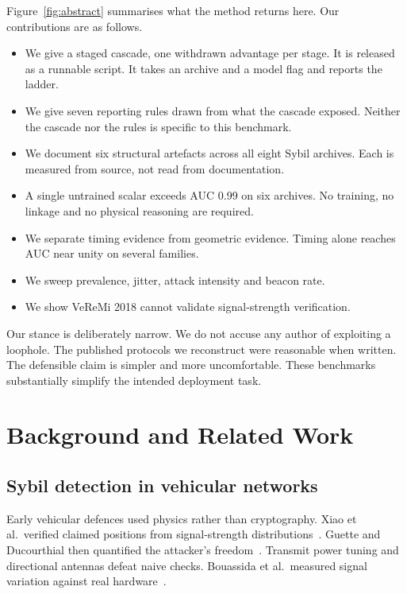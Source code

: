 \documentclass[conference]{IEEEtran}
\begin{document}
Figure~\ref{fig:abstract} summarises what the method returns here.
Our contributions are as follows.

\begin{itemize}
  \item We give a staged cascade, one withdrawn advantage per stage.
        It is released as a runnable script.
        It takes an archive and a model flag and reports the ladder.
  \item We give seven reporting rules drawn from what the cascade exposed.
        Neither the cascade nor the rules is specific to this benchmark.
  \item We document six structural artefacts across all eight Sybil archives.
        Each is measured from source, not read from documentation.
  \item A single untrained scalar exceeds AUC 0.99 on six archives.
        No training, no linkage and no physical reasoning are required.
  \item We separate timing evidence from geometric evidence.
        Timing alone reaches AUC near unity on several families.
  \item We sweep prevalence, jitter, attack intensity and beacon rate.
  \item We show VeReMi 2018 cannot validate signal-strength verification.
\end{itemize}

Our stance is deliberately narrow.
We do not accuse any author of exploiting a loophole.
The published protocols we reconstruct were reasonable when written.
The defensible claim is simpler and more uncomfortable.
These benchmarks substantially simplify the intended deployment task.

\section{Background and Related Work}

\subsection{Sybil detection in vehicular networks}

Early vehicular defences used physics rather than cryptography.
Xiao et al.\ verified claimed positions from signal-strength distributions~\cite{xiao2006}.
Guette and Ducourthial then quantified the attacker's freedom~\cite{guette2007}.
Transmit power tuning and directional antennas defeat naive checks.
Bouassida et al.\ measured signal variation against real hardware~\cite{bouassida2009}.
\end{document}

